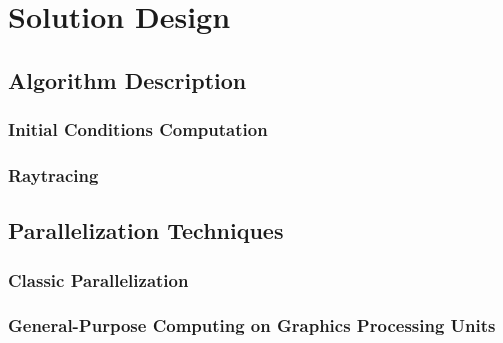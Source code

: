 \chapter{Solution Design}

\section{Algorithm Description}
\subsection{Initial Conditions Computation}
\subsection{Raytracing}

\section{Parallelization Techniques}
\subsection{Classic Parallelization}
\subsection{General-Purpose Computing on Graphics Processing Units}